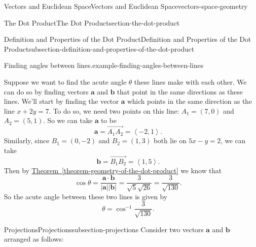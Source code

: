 \documentclass[oneside,10pt,]{book}
\numberwithin{equation}{section}
\newcommand{\vv}[1]{\mathbf{#1}}
\newcommand{\dotprod}[1]{\left\langle #1 \right\rangle}
\begin{document}
\begin{chapterptx}{Vectors and Euclidean Space}{}{Vectors and Euclidean Space}{}{}{vectors-space-geometry}
\begin{sectionptx}{The Dot Product}{}{The Dot Product}{}{}{section-the-dot-product}
\begin{subsectionptx}{Definition and Properties of the Dot Product}{}{Definition and Properties of the Dot Product}{}{}{subsection-definition-and-properties-of-the-dot-product}
\begin{example}{Finding angles between lines.}{example-finding-angles-between-lines}
\begin{figure}
{
}
\end{figure}
\hypertarget{p-1149}{}%
Suppose we want to find the acute angle \(\theta\) these lines make with each other. We can do so by finding vectors \(\vv{a}\) and \(\vv{b}\) that point in the same directions as these lines. We'll start by finding the vector \(\vv{a}\) which points in the same direction as the line \(x+2y=7\). To do so, we need two points on this line: \(A_{1} = (7,0)\) and \(A_{2} = (5,1)\). So we can take \(\vv{a}\) to be%
%
\begin{equation*}
\vv{a} = \overrightarrow{A_{1}A_{2}} = \dotprod{-2,1}.
\end{equation*}
\hypertarget{p-1150}{}%
Similarly, since \(B_{1} = (0,-2)\) and \(B_{2} = (1,3)\) both lie on \(5x-y = 2\), we can take%
%
\begin{equation*}
\vv{b} = \overrightarrow{B_{1}B_{2}} = \dotprod{1,5}.
\end{equation*}
\hypertarget{p-1151}{}%
Then by \hyperref[theorem-geometry-of-the-dot-product]{Theorem~\ref{theorem-geometry-of-the-dot-product}} we know that%
%
\begin{equation*}
\cos\theta = \frac{\vv{a}\cdot\vv{b}}{|\vv{a}||\vv{b}|} = \frac{3}{\sqrt{5}\sqrt{26}} = \frac{3}{\sqrt{130}}.
\end{equation*}
\hypertarget{p-1152}{}%
So the acute angle between these two lines is given by%
%
\begin{equation*}
\theta = \cos^{-1}\frac{3}{\sqrt{130}}.
\end{equation*}
\end{example}
\end{subsectionptx}
%
%
\typeout{************************************************}
\typeout{************************************************}
%
\begin{subsectionptx}{Projections}{}{Projections}{}{}{subsection-projections}
\hypertarget{p-1153}{}%
Consider two vectors \(\vv{a}\) and \(\vv{b}\) arranged as follows:%
\begin{figure}
\centering
{
\begin{tikzpicture}[vector/.style={-stealth,blue,very thick}]

\end{tikzpicture}}
\end{figure}
\end{subsectionptx}
\end{sectionptx}
\end{chapterptx}
\end{document}
